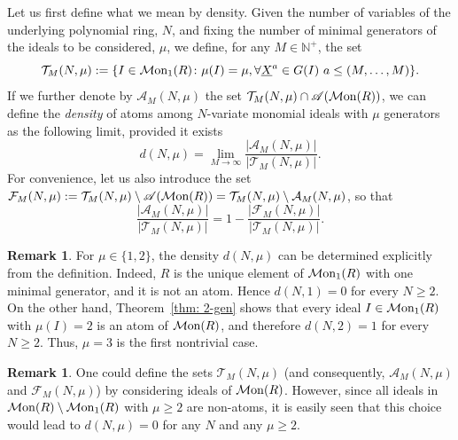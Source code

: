 \documentclass[a4paper,10pt,reqno]{amsart}
\theoremstyle{definition}
\theoremstyle{definition}
\newtheorem{remark}[theorem]{Remark}
\providecommand\Mon{{\mathcal{M}{\rm on}}}
\begin{document}
Let us first define what we mean by density. Given the number of variables of the underlying polynomial ring, $N$, and fixing the number of minimal generators of the ideals to be considered, $\mu$, we define, for any $M\in\mathbb N^+$, the set
\[ \mathcal T_M(N,\mu) := \{I\in\Mon_1(R)\colon \mu(I)=\mu, \forall \underline X^a\in G(I)\ a\le (M,\dots,M)\}. \]
If we further denote by $\mathcal A_M(N,\mu) $ the set $\mathcal T_M(N,\mu) \cap \mathscr A(\Mon(R))$, we can define the \emph{density} of atoms among $N$-variate monomial ideals with $\mu$ generators as the following limit, provided it exists
\[ d(N,\mu) = \lim_{M\to\infty} \frac{\lvert \mathcal A_M(N,\mu)\rvert}{\lvert \mathcal T_M(N,\mu)\rvert}.\]
For convenience, let us also introduce the set $\mathcal F_M(N,\mu):=\mathcal T_M(N,\mu)\setminus {\mathscr A(\Mon(R))}=\mathcal T_M(N,\mu)\setminus\mathcal A_M(N,\mu)$, so that 
\[ \frac{\lvert \mathcal A_M(N,\mu)\rvert}{\lvert \mathcal T_M(N,\mu)\rvert} = 1-\frac{\lvert \mathcal F_M(N,\mu)\rvert}{\lvert \mathcal T_M(N,\mu)\rvert}. \]

\begin{remark}
For $\mu\in\{1,2\}$, the density $d(N,\mu)$ can be determined explicitly from the definition. Indeed, $R$ is the unique element of $\Mon_1(R)$ with one minimal generator, and it is not an atom. Hence $d(N,1)=0$ for every $N\ge2$. On the other hand, Theorem~\ref{thm: 2-gen} shows that every ideal $I\in\Mon_1(R)$ with $\mu(I)=2$ is an atom of $\Mon(R)$, and therefore $d(N,2)=1$ for every $N\ge2$. Thus, $\mu=3$ is the first nontrivial case.
\end{remark}

\begin{remark}
One could define the sets $\mathcal T_M(N,\mu)$ (and consequently, $\mathcal A_M(N,\mu)$ and $\mathcal F_M(N,\mu)$) by considering ideals of $\Mon(R)$. However, since all ideals in $\Mon(R)\setminus\Mon_1(R)$ with $\mu\ge 2$ are non-atoms, it is easily seen that this choice would lead to $d(N,\mu)=0$ for any $N$ and any $\mu\ge 2$.
\end{remark}
\end{document}

